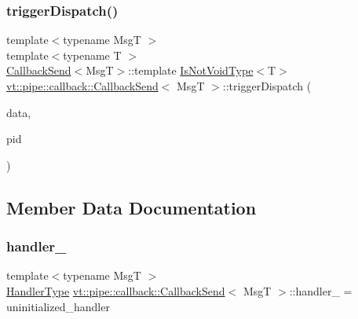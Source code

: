 \mbox{\label{structvt_1_1pipe_1_1callback_1_1_callback_send_a26915bf9dac921974b7d4a7cb156083a}} 
\subsubsection{\texorpdfstring{trigger\+Dispatch()}{triggerDispatch()}\hspace{0.1cm}{\footnotesize\ttfamily [4/4]}}
{\footnotesize\ttfamily template$<$typename MsgT $>$ \\
template$<$typename T $>$ \\
\hyperlink{structvt_1_1pipe_1_1callback_1_1_callback_send}{Callback\+Send}$<$MsgT$>$\+::template \hyperlink{structvt_1_1pipe_1_1callback_1_1_callback_send_adb85e64e67e00aa71a9c173565dfb7dc}{Is\+Not\+Void\+Type}$<$T$>$ \hyperlink{structvt_1_1pipe_1_1callback_1_1_callback_send}{vt\+::pipe\+::callback\+::\+Callback\+Send}$<$ MsgT $>$\+::trigger\+Dispatch (\begin{DoxyParamCaption}\item[{\hyperlink{structvt_1_1pipe_1_1callback_1_1_callback_send_a5b21820f25b28f980921b1fe24d8a2dc}{Signal\+Data\+Type} $\ast$}]{data,  }\item[{\hyperlink{namespacevt_ac9852acda74d1896f48f406cd72c7bd3}{Pipe\+Type} const \&}]{pid }\end{DoxyParamCaption})}



\subsection{Member Data Documentation}
\mbox{\label{structvt_1_1pipe_1_1callback_1_1_callback_send_adc779eec6db67dce8bedd1b4bb13319a}} 
\subsubsection{\texorpdfstring{handler\+\_\+}{handler\_}}
{\footnotesize\ttfamily template$<$typename MsgT $>$ \\
\hyperlink{namespacevt_af64846b57dfcaf104da3ef6967917573}{Handler\+Type} \hyperlink{structvt_1_1pipe_1_1callback_1_1_callback_send}{vt\+::pipe\+::callback\+::\+Callback\+Send}$<$ MsgT $>$\+::handler\+\_\+ = uninitialized\+\_\+handler\hspace{0.3cm}{\ttfamily [private]}}

